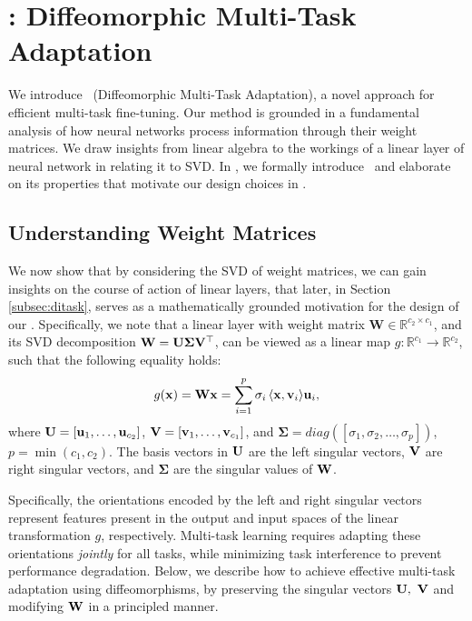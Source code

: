 \section{\ourmethod: Diffeomorphic Multi-Task Adaptation}
\label{sec:method}

We introduce \ourmethod\ (Diffeomorphic Multi-Task Adaptation), a novel approach for efficient multi-task fine-tuning. Our method is grounded in a fundamental analysis of how neural networks process information through their weight matrices. We draw insights from linear algebra to the workings of a linear layer of neural network in  relating it to SVD. In , we formally introduce \ourmethod\ and elaborate on its properties that motivate our design choices in .

\subsection{Understanding Weight Matrices}
\label{subsec:motivation}
We now show that by considering the SVD of weight matrices, we can gain insights on the course of action of linear layers, that later, in Section \ref{subsec:ditask}, serves as a mathematically grounded motivation for the design of our \ourmethod. Specifically, we note that  a linear layer with weight matrix $\mathbf{W} \in \mathbb{R}^{c_2 \times c_1}$, and its SVD decomposition $\bf W = \bf U \bf \Sigma \bf V^\top$, can be viewed as a linear map $g: \mathbb{R}^{c_1} \rightarrow \mathbb{R}^{c_2}$, such that the following equality holds:
\begin{equation}
    g({\mathbf{x}}) = \mathbf{W} \mathbf{x} = \sum\limits_{i=1}^{p} \sigma_i \, \langle {\mathbf{x}}, {\mathbf{v}}_i \rangle {\mathbf{u}}_i,
\end{equation}
where ${\mathbf{U}} = [{\mathbf{u}}_1, \ldots, {\mathbf{u}}_{c_2}]$, ${\mathbf{V}} = [{\mathbf{v}}_1, \ldots, {\mathbf{v}}_{c_1}]$, and $\mathbf{\Sigma} = diag([\sigma_1, \sigma_2, \ldots, \sigma_{p}])$, $p = \min(c_1, c_2)$. The basis vectors in ${\mathbf{U}}$ are the left singular vectors, $\bf V$ are right singular vectors, and $\mathbf{\Sigma}$ are the singular values of ${\mathbf{W}}$.

\noindent Specifically, the orientations encoded by the left and right singular vectors represent features present in the output and input spaces of the linear transformation $g$, respectively. Multi-task learning requires adapting these orientations \emph{jointly} for all tasks, while minimizing task interference to prevent performance degradation. Below, we describe how to achieve effective multi-task adaptation using diffeomorphisms, by preserving the singular vectors $\bf U, \ \bf V$ and modifying $\bf W$ in a principled manner.


